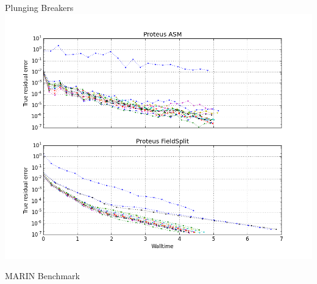 \documentclass{beamer}
\begin{document}
\begin{frame}{Plunging Breakers}
    \includegraphics[width=\textwidth]{figures/plunging_comparison.png}
\end{frame}

\begin{frame}{MARIN Benchmark}
\end{frame}
\end{document}

